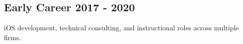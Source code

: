 \subsection{\textbf{Early Career} \hfill 2017 - 2020}
\noindent iOS development, technical consulting, and instructional roles across multiple firms.
